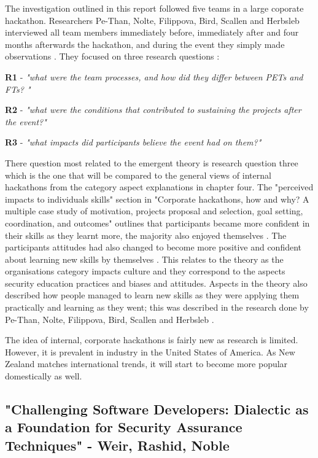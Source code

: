 The investigation outlined in this report followed five teams in a large coporate hackathon. Researchers  Pe-Than,  Nolte, Filippova, Bird, Scallen and Herbsleb interviewed all team members immediately before, immediately after and four months afterwards the hackathon, and during the event they simply made observations \cite{corp}. They focused on three research questions \cite{corp}:
\newline
\par
\textbf{R1} - \textit{"what were the team processes, and how did they differ between PETs and FTs?  "}
\newline
\par
\textbf{R2} - \textit{"what were the conditions that contributed to sustaining the projects after the event?"}
\newline
\par
\textbf{R3} - \textit{"what impacts did participants believe the event had on them?"}
\newline
\par
There question most related to the emergent theory is research question three which is the one that will be compared to the general views of internal hackathons from the category aspect explanations in chapter four. The "perceived impacts to individuals skills" section in "Corporate hackathons, how and why? A multiple case study of motivation, projects proposal and selection, goal setting, coordination, and outcomes" outlines that participants became more confident in their skills as they learnt more, the majority also enjoyed themselves \cite{corp}. The participants attitudes had also changed to become more positive and confident about learning new skills by themselves \cite{corp}. This relates to the theory as the organisations category impacts culture and they correspond to the aspects security education practices and biases and attitudes. Aspects in the theory also described how people managed to learn new skills as they were applying them practically and learning as they went; this was described in the research done by Pe-Than,  Nolte, Filippova, Bird, Scallen and Herbsleb \cite{corp}.
\newline
\par
The idea of internal, corporate hackathons is fairly new as research is limited. However, it is prevalent in industry in the United States of America. As New Zealand matches international trends, it will start to become more popular domestically as well. 

\subsection{"Challenging Software Developers: Dialectic as a Foundation for Security Assurance Techniques" - Weir, Rashid, Noble}

